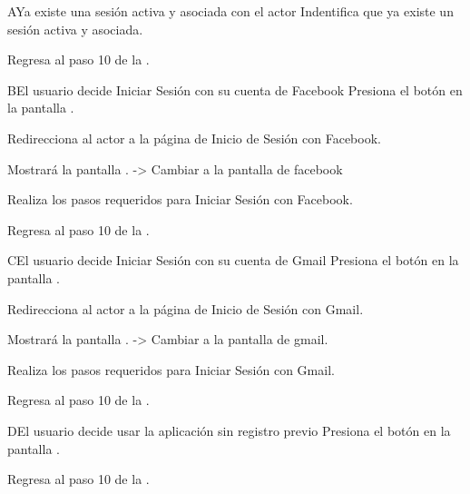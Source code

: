 	\begin{UCtrayectoriaA}{A}{Ya existe una sesión activa y asociada con el actor}
		\UCpaso Indentifica que ya existe un sesión activa y asociada.
		
		\UCpaso Regresa al paso 10 de la .
	\end{UCtrayectoriaA}

	\begin{UCtrayectoriaA}{B}{El usuario decide Iniciar Sesión con su cuenta de Facebook}
		\UCpaso[\UCactor] Presiona el botón  en la pantalla .
		
		\UCpaso Redirecciona al actor a la página de Inicio de Sesión con Facebook.
		
		\UCpaso Mostrará la pantalla . -> Cambiar a la pantalla de facebook
		
		\UCpaso [\UCactor] Realiza los pasos requeridos para Iniciar Sesión con Facebook.
		
		\UCpaso Regresa al paso 10 de la .
	\end{UCtrayectoriaA}
	
	\begin{UCtrayectoriaA}{C}{El usuario decide Iniciar Sesión con su cuenta de Gmail}
		\UCpaso[\UCactor] Presiona el botón  en la pantalla .
		
		\UCpaso Redirecciona al actor a la página de Inicio de Sesión con Gmail.
		
		\UCpaso Mostrará la pantalla . -> Cambiar a la pantalla de gmail.
		
		\UCpaso[\UCactor] Realiza los pasos requeridos para Iniciar Sesión con Gmail.
		
		\UCpaso Regresa al paso 10 de la .
	\end{UCtrayectoriaA}

	\begin{UCtrayectoriaA}{D}{El usuario decide usar la aplicación sin registro previo}
		\UCpaso[\UCactor] Presiona el botón  en la pantalla .
		
		\UCpaso Regresa al paso 10 de la .
	\end{UCtrayectoriaA}

%
